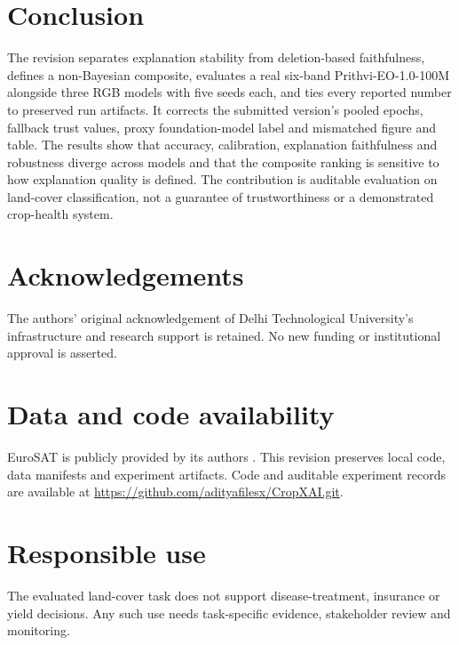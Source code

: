 \documentclass[3p,times,procedia]{elsarticle}
\begin{document}
\section{Conclusion}\label{sec:conclusion}
The revision separates explanation stability from deletion-based faithfulness, defines a non-Bayesian composite, evaluates a real six-band Prithvi-EO-1.0-100M alongside three RGB models with five seeds each, and ties every reported number to preserved run artifacts. It corrects the submitted version's pooled epochs, fallback trust values, proxy foundation-model label and mismatched figure and table. The results show that accuracy, calibration, explanation faithfulness and robustness diverge across models and that the composite ranking is sensitive to how explanation quality is defined. The contribution is auditable evaluation on land-cover classification, not a guarantee of trustworthiness or a demonstrated crop-health system.

\section*{Acknowledgements}
The authors' original acknowledgement of Delhi Technological University's infrastructure and research support is retained. No new funding or institutional approval is asserted.

\section*{Data and code availability}
EuroSAT is publicly provided by its authors \cite{eurosat}. This revision preserves local code, data manifests and experiment artifacts. Code and auditable experiment records are available at \url{https://github.com/adityafilesx/CropXAI.git}.

\section*{Responsible use}
The evaluated land-cover task does not support disease-treatment, insurance or yield decisions. Any such use needs task-specific evidence, stakeholder review and monitoring.



\end{document}
